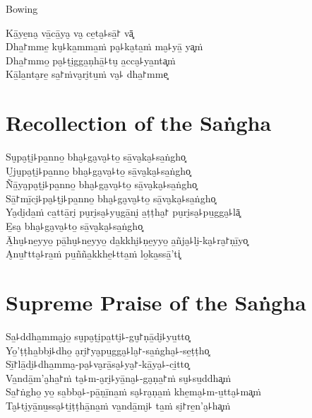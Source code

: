 \begin{instruction}
  Bowing
\end{instruction}

Kā̱ye̱na̮ vā̱cā̱ya̮ va̮ ce̱ta̮꜕sā̱꜓ vā͓\\
Dha̱꜓mme̱ ku̮꜕ka̱mma̱ṁ pa̮꜕ka̮ta̱ṁ ma̮꜕yā̱ ya͓ṁ\\
Dha̱꜓mmo̱ pa̮꜕ṭi̱gga̱ṇhā̱꜕tu̮ a̱cca̮꜕ya̱nta͓ṁ\\
Kā̱la̱nta̮re̱ sa̱꜓ṁva̮ri̮tu̱ṁ va̮꜕ dha̱꜓mme͓

\chapter*{Recollection of the Saṅgha}

\delegateSetUseNext

\begin{leader}
\end{leader}

Su̮pa̮ṭi̮꜕pa̱nno̱ bha̮꜕ga̮va̮꜕to̱ sā̱va̮ka̮꜕sa̱ṅgho͓\\
U̮ju̮pa̮ṭi̮꜕pa̱nno̱ bha̮꜕ga̮va̮꜕to̱ sā̱va̮ka̮꜕sa̱ṅgho͓\\
Ñā̱ya̮pa̮ṭi̮꜕pa̱nno̱ bha̮꜕ga̮va̮꜕to̱ sā̱va̮ka̮꜕sa̱ṅgho͓\\
Sā̱꜓mī̱ci̮꜕pa̮꜕ṭi̮꜕pa̱nno̱ bha̮꜕ga̮va̮꜕to̱ sā̱va̮ka̮꜕sa̱ṅgho͓\\
Ya̮di̮da̱ṁ ca̱ttā̱ri̮ pu̮ri̮sa̮꜕yu̮gā̱ni̮ a̱ṭṭha̮꜓ pu̮ri̮sa̮꜕pu̱gga̮꜕lā͓\\
E̱sa̮ bha̮꜕ga̮va̮꜕to̱ sā̱va̮ka̮꜕sa̱ṅgho͓\\
Ā̱hu̮꜕ne̱yyo̱ pā̱hu̮꜕ne̱yyo̱ da̱kkhi̮꜕ṇe̱yyo̱ a̱ñja̮꜕li̮-ka̮꜕ra̮꜓ṇī̱yo͓\\
A̮nu̱꜓tta̮꜕ra̱ṁ pu̱ñña̱kkhe̱꜕tta̱ṁ lo̱ka̱ssā̱'ti͓

\chapter*{Supreme Praise of the Saṅgha}

\begin{leader}
\end{leader}

Sa̱꜕ddha̱mma̮jo̱ su̮pa̮ṭi̮pa̱tti̮꜕-gu̮꜓ṇā̱di̮꜕yu̱tto͓\\
Yo̱'ṭṭha̱bbi̮꜕dho̱ a̮ri̮꜓ya̮pu̱gga̮꜕la̮꜓-sa̱ṅgha̮꜕-se̱ṭṭho͓\\
Sī̱꜓lā̱di̮꜕dha̱mma̮-pa̮꜕va̮rā̱sa̮꜕ya̮꜓-kā̱ya̮꜕-ci̱tto͓\\
Va̱ndā̱m'a̮ha̱꜓ṁ ta̮꜕m-a̮ri̮꜕yā̱na̮꜕-ga̮ṇa̱꜓ṁ su̮꜕su̱ddha͓ṁ\\
Sa̱꜓ṅgho̱ yo̱ sa̱bba̮꜕-pā̱ṇī̱na̱ṁ sa̮꜕ra̮ṇa̱ṁ khe̱ma̮꜕m-u̱tta̮꜕ma͓ṁ\\
Ta̮꜕ti̮yā̱nu̱ssa̮꜕ti̱ṭṭhā̱na̱ṁ va̱ndā̱mi̮꜕ ta̱ṁ si̮꜓re̱n'a̮꜕ha͓ṁ

